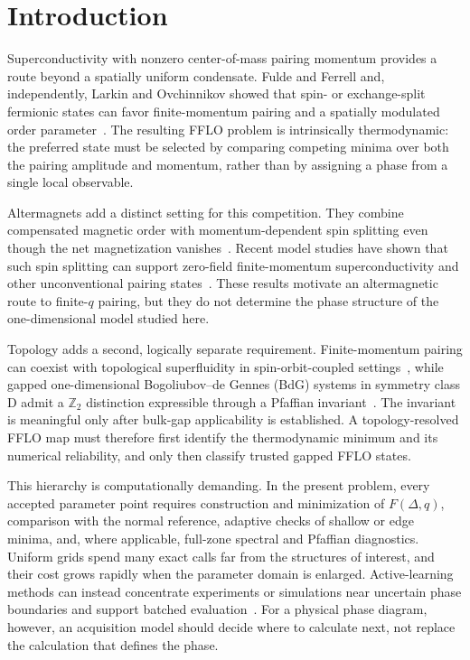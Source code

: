 \section{Introduction}
Superconductivity with nonzero center-of-mass pairing momentum provides a route beyond a spatially uniform condensate. Fulde and Ferrell and, independently, Larkin and Ovchinnikov showed that spin- or exchange-split fermionic states can favor finite-momentum pairing and a spatially modulated order parameter~\cite{FuldeFerrell1964,LarkinOvchinnikov1965,CasalbuoniNardulli2004}. The resulting FFLO problem is intrinsically thermodynamic: the preferred state must be selected by comparing competing minima over both the pairing amplitude and momentum, rather than by assigning a phase from a single local observable.

Altermagnets add a distinct setting for this competition. They combine compensated magnetic order with momentum-dependent spin splitting even though the net magnetization vanishes~\cite{SmejkalSinovaJungwirth2022}. Recent model studies have shown that such spin splitting can support zero-field finite-momentum superconductivity and other unconventional pairing states~\cite{ChakrabortyBlackSchaffer2024,HongParkKim2025}. These results motivate an altermagnetic route to finite-$q$ pairing, but they do not determine the phase structure of the one-dimensional model studied here.

Topology adds a second, logically separate requirement. Finite-momentum pairing can coexist with topological superfluidity in spin-orbit-coupled settings~\cite{ZhangYi2013}, while gapped one-dimensional Bogoliubov--de Gennes (BdG) systems in symmetry class D admit a $\mathbb Z_2$ distinction expressible through a Pfaffian invariant~\cite{Kitaev2001,BudichArdonne2013}. The invariant is meaningful only after bulk-gap applicability is established. A topology-resolved FFLO map must therefore first identify the thermodynamic minimum and its numerical reliability, and only then classify trusted gapped FFLO states.

This hierarchy is computationally demanding. In the present problem, every accepted parameter point requires construction and minimization of $F(\Delta,q)$, comparison with the normal reference, adaptive checks of shallow or edge minima, and, where applicable, full-zone spectral and Pfaffian diagnostics. Uniform grids spend many exact calls far from the structures of interest, and their cost grows rapidly when the parameter domain is enlarged. Active-learning methods can instead concentrate experiments or simulations near uncertain phase boundaries and support batched evaluation~\cite{TerayamaEtAl2019,DaiBrussGlotzer2020,LookmanEtAl2019}. For a physical phase diagram, however, an acquisition model should decide where to calculate next, not replace the calculation that defines the phase.

